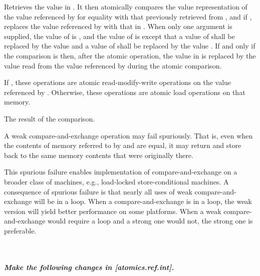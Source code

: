 \begin{itemdescr}
\begin{removedblock}
Retrieves the value in .
It then atomically compares the value representation of
the value referenced by  for equality
with that previously retrieved from ,
and if , replaces the value referenced by 
with that in .
When only one  argument is supplied,
the value of  is , and
the value of  is 
except that a value of  shall be replaced by
the value  and
a value of  shall be replaced by
the value .
If and only if the comparison is  then,
after the atomic operation,
the value in  is replaced by
the value read from the value referenced by 
during the atomic comparison.
\end{removedblock}
If  ,
these operations are atomic read-modify-write operations
on the value referenced by .
Otherwise, these operations are atomic load operations on that memory.

\begin{removedblock}
\pnum
\returns The result of the comparison.
\end{removedblock}

\pnum
\remarks A weak compare-and-exchange operation may fail spuriously.
That is, even when the contents of memory referred to
by  and  are equal,
it may return  and
store back to  the same memory contents
that were originally there.
\begin{note}
This spurious failure enables implementation of compare-and-exchange
on a broader class of machines, e.g., load-locked store-conditional machines.
A consequence of spurious failure is
that nearly all uses of weak compare-and-exchange will be in a loop.
When a compare-and-exchange is in a loop,
the weak version will yield better performance on some platforms.
When a weak compare-and-exchange would require a loop and
a strong one would not, the strong one is preferable.
\end{note}
\end{itemdescr}

~\\
~\\

\textbf{\textit{Make the following changes in [atomics.ref.int].}} \\

